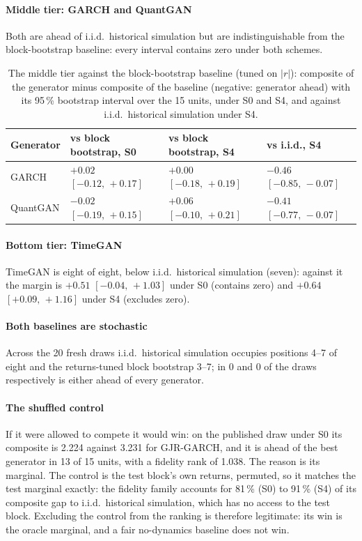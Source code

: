 \documentclass[11pt,a4paper]{article}
\makeatletter
\DeclareRobustCommand{\_}{\ifmmode\nfss@text{\textunderscore}\else\textunderscore\allowbreak\fi}
\makeatother
\begin{document}
\paragraph{Middle tier: GARCH and QuantGAN} Both are ahead of i.i.d.\ historical simulation but are indistinguishable from the block-bootstrap baseline: every interval contains zero under both schemes.

\begin{table}[htbp]
\centering
\caption{The middle tier against the block-bootstrap baseline (tuned on $|r|$): composite of the generator minus composite of the baseline (negative: generator ahead) with its 95\,\% bootstrap interval over the 15 units, under S0 and S4, and against i.i.d.\ historical simulation under S4.}
\label{tab:mid}
\begin{tabular}{@{}llll@{}}
\toprule
Generator & vs block bootstrap, S0 & vs block bootstrap, S4 & vs i.i.d., S4 \\
\midrule
GARCH & $+0.02$ $[-0.12,\,+0.17]$ & $+0.00$ $[-0.18,\,+0.19]$ & $-0.46$ $[-0.85,\,-0.07]$ \\
QuantGAN & $-0.02$ $[-0.19,\,+0.15]$ & $+0.06$ $[-0.10,\,+0.21]$ & $-0.41$ $[-0.77,\,-0.07]$ \\
\bottomrule
\end{tabular}
\end{table}

\paragraph{Bottom tier: TimeGAN} TimeGAN is eight of eight, below i.i.d.\ historical simulation (seven): against it the margin is $+0.51$ $[-0.04,\,+1.03]$ under S0 (contains zero) and $+0.64$ $[+0.09,\,+1.16]$ under S4 (excludes zero).

\paragraph{Both baselines are stochastic} Across the 20 fresh draws i.i.d.\ historical simulation occupies positions 4--7 of eight and the returns-tuned block bootstrap 3--7; in 0 and 0 of the draws respectively is either ahead of every generator.

\paragraph{The shuffled control} If it were allowed to compete it would win: on the published draw under S0 its composite is 2.224 against 3.231 for GJR-GARCH, and it is ahead of the best generator in 13 of 15 units, with a fidelity rank of 1.038. The reason is its marginal. The control is the test block's own returns, permuted, so it matches the test marginal exactly: the fidelity family accounts for 81\,\% (S0) to 91\,\% (S4) of its composite gap to i.i.d.\ historical simulation, which has no access to the test block. Excluding the control from the ranking is therefore legitimate: its win is the oracle marginal, and a fair no-dynamics baseline does not win.
\end{document}
